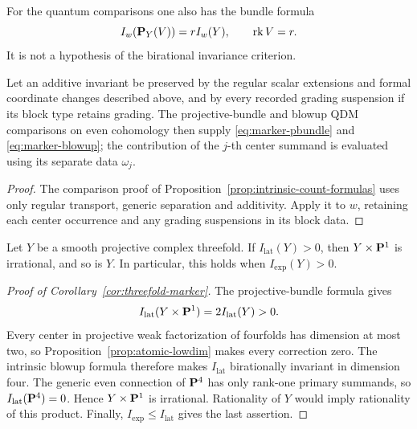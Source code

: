 For the quantum comparisons one also has the bundle formula
\begin{equation}
 I_w(\mathbf P_Y(V))=rI_w(Y),\qquad\operatorname{rk} V=r.
 \label{eq:marker-pbundle}
\end{equation}
It is not a hypothesis of the birational invariance criterion.

\begin{proposition}
\label{prop:qdm-operation-ledgers}
%
%
%
Let an additive invariant be preserved by the regular scalar extensions and formal
coordinate changes described above, and by every recorded grading suspension
if its block type retains grading.  The projective-bundle and blowup QDM
comparisons on even cohomology then supply \eqref{eq:marker-pbundle} and
\eqref{eq:marker-blowup}; the contribution of the \(j\)-th center summand is
evaluated using its separate data \(\omega_j\).
\end{proposition}

\begin{proof}
The comparison proof of Proposition~\ref{prop:intrinsic-count-formulas}
uses only regular transport, generic separation and additivity.
Apply it to \(w\), retaining each center occurrence and any grading
suspensions in its block data.
%
%
\end{proof}

\begin{corollary}
\label{cor:threefold-marker}
%
%
Let \(Y\) be a smooth projective complex threefold.  If
\(I_{\mathrm{lat}}(Y)>0\), then \(Y\times\mathbf P^1\) is irrational, and so
is \(Y\).  In particular, this holds when \(I_{\mathrm{exp}}(Y)>0\).
\end{corollary}

\begin{proof}[Proof of Corollary~\ref{cor:threefold-marker}]
The projective-bundle formula gives
\[
 I_{\mathrm{lat}}(Y\times\mathbf P^1)=2I_{\mathrm{lat}}(Y)>0.
\]
Every center in projective weak factorization of fourfolds has dimension
at most two, so Proposition~\ref{prop:atomic-lowdim} makes every correction
zero.  The intrinsic blowup formula therefore makes \(I_{\mathrm{lat}}\)
birationally invariant in dimension four.  The generic even connection of
\(\mathbf P^4\) has only rank-one primary summands, so
\(I_{\mathrm{lat}}(\mathbf P^4)=0\).  Hence \(Y\times\mathbf P^1\) is irrational.
Rationality of \(Y\) would imply rationality of this product.
Finally, \(I_{\mathrm{exp}}\le I_{\mathrm{lat}}\) gives the last assertion.
%
%
%
\end{proof}

